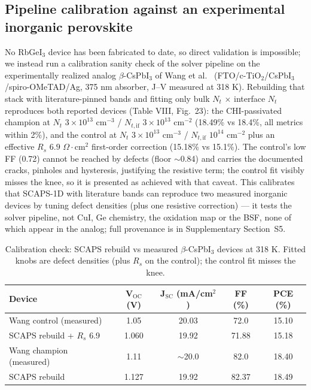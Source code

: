 \documentclass[review]{elsarticle}
\begin{document}
\subsection{Pipeline calibration against an experimental inorganic perovskite}
No RbGeI$_{3}$ device has been fabricated to date, so direct validation is impossible; we instead run a calibration sanity check of the solver pipeline on the experimentally realized analog $\beta$-CsPbI$_{3}$ of Wang et al.\ \cite{rWang} (FTO/c-TiO$_{2}$/CsPbI$_{3}$/spiro-OMeTAD/Ag, 375 nm absorber, J--V measured at 318 K). Rebuilding that stack with literature-pinned bands and fitting only bulk $N_{t}$ $\times$ interface $N_{t}$ reproduces both reported devices (Table VIII, Fig.~23): the CHI-passivated champion at $N_{t}$ $3\times10^{13}$ cm$^{-3}$ / $N_{t,\mathrm{if}}$ $3\times10^{13}$ cm$^{-2}$ (18.49\% vs 18.4\%, all metrics within 2\%), and the control at $N_{t}$ $3\times10^{13}$ cm$^{-3}$ / $N_{t,\mathrm{if}}$ $10^{14}$ cm$^{-2}$ plus an effective $R_{s}$ $6.9$ $\Omega\cdot$cm$^{2}$ first-order correction (15.18\% vs 15.1\%). The control's low FF (0.72) cannot be reached by defects (floor $\sim$0.84) and carries the documented cracks, pinholes and hysteresis, justifying the resistive term; the control fit visibly misses the knee, so it is presented as achieved with that caveat. This calibrates that SCAPS-1D with literature bands can reproduce two measured inorganic devices by tuning defect densities (plus one resistive correction) --- it tests the solver pipeline, not CuI, Ge chemistry, the oxidation map or the BSF, none of which appear in the analog; full provenance is in Supplementary Section~S5.

\begin{table}[htbp]
\centering
{\footnotesize\setlength{\tabcolsep}{3pt}
\begin{tabularx}{\textwidth}{Xcccc}
\hline
Device & V$_{\mathrm{OC}}$ (V) & J$_{\mathrm{SC}}$ (mA/cm$^{2}$) & FF (\%) & PCE (\%)
\\\hline
Wang control (measured) & 1.05 & 20.03 & 72.0 & 15.10\\
SCAPS rebuild + $R_{s}$ 6.9 & 1.060 & 19.92 & 71.88 & 15.18\\
Wang champion (measured) & 1.11 & $\sim$20.0 & 82.0 & 18.40\\
SCAPS rebuild & 1.127 & 19.92 & 82.37 & 18.49\\
\hline
\end{tabularx}
}
\caption{Calibration check: SCAPS rebuild vs measured $\beta$-CsPbI$_{3}$ devices \cite{rWang} at 318 K. Fitted knobs are defect densities (plus $R_{s}$ on the control); the control fit misses the knee.}
\end{table}
\end{document}
